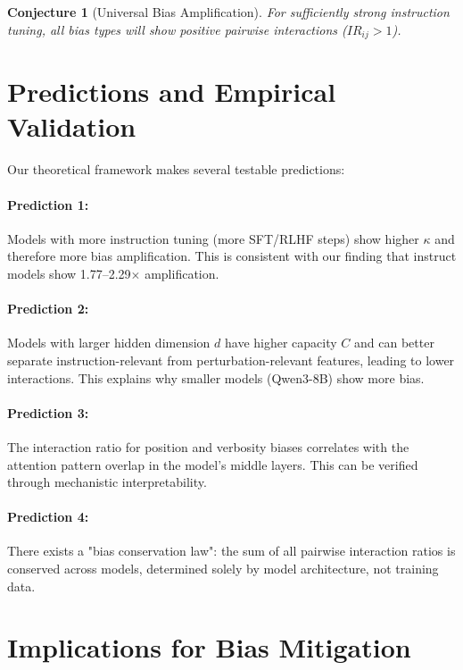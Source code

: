 \documentclass[11pt]{article}
\newtheorem{conjecture}{Conjecture}
\begin{document}
\begin{conjecture}[Universal Bias Amplification]
For sufficiently strong instruction tuning, all bias types will show positive pairwise interactions ($IR_{ij} > 1$).
\end{conjecture}

\section{Predictions and Empirical Validation}

Our theoretical framework makes several testable predictions:

\paragraph{Prediction 1:} Models with more instruction tuning (more SFT/RLHF steps) show higher $\kappa$ and therefore more bias amplification. This is consistent with our finding that instruct models show 1.77--2.29$\times$ amplification.

\paragraph{Prediction 2:} Models with larger hidden dimension $d$ have higher capacity $C$ and can better separate instruction-relevant from perturbation-relevant features, leading to lower interactions. This explains why smaller models (Qwen3-8B) show more bias.

\paragraph{Prediction 3:} The interaction ratio for position and verbosity biases correlates with the attention pattern overlap in the model's middle layers. This can be verified through mechanistic interpretability.

\paragraph{Prediction 4:} There exists a "bias conservation law": the sum of all pairwise interaction ratios is conserved across models, determined solely by model architecture, not training data.

\section{Implications for Bias Mitigation}
\end{document}

